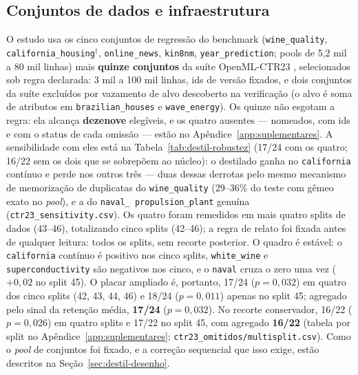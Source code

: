 \subsection{Conjuntos de dados e infraestrutura}
\label{sec:destil-setup}

\begin{sloppypar}
O estudo usa os cinco conjuntos de regressão do benchmark
(\texttt{wine\_quality}, \texttt{california\_\allowbreak housing}$^\dagger$,
\texttt{online\_news}, \texttt{kin8nm}, \texttt{year\_\allowbreak prediction};
pools de 5,2 mil a 80 mil linhas) mais \textbf{quinze conjuntos} da
suíte OpenML-CTR23 \citep{fischer2023}, selecionados sob regra
declarada: 3 mil a 100 mil linhas, ids de versão fixados, e dois
conjuntos da suíte excluídos por vazamento de alvo descoberto na
verificação (o alvo é soma de atributos em
\texttt{brazilian\_\allowbreak houses} e \texttt{wave\_energy}). Os
quinze não esgotam a regra: ela alcança \textbf{dezenove} elegíveis, e
os quatro ausentes --- nomeados, com ids e com o status de cada
omissão --- estão no Apêndice~\ref{app:suplementares}. A sensibilidade
com eles está na Tabela~\ref{tab:destil-robustez} (17/24 com os
quatro; 16/22 sem os dois que se sobrepõem ao núcleo): o destilado
ganha no \texttt{california} contínuo e perde nos outros três ---
duas dessas derrotas pelo mesmo mecanismo de memorização de
duplicatas do \texttt{wine\_quality} (29--36\% do teste com gêmeo
exato no \emph{pool}), e a do \texttt{naval\_\allowbreak
propulsion\_\allowbreak plant} genuína
(\texttt{ctr23\_\allowbreak sensitivity.csv}). Os quatro foram
remedidos em mais
quatro splits de dados (43--46), totalizando cinco splits (42--46);
a regra de relato foi
fixada antes de qualquer leitura: todos os splits, sem recorte
posterior. O quadro é estável: o \texttt{california} contínuo é
positivo nos cinco splits, \texttt{white\_wine} e
\texttt{superconductivity} são negativos nos cinco, e o
\texttt{naval} cruza o zero uma vez ($+0{,}02$ no split 45). O
placar ampliado é, portanto, 17/24 ($p=0{,}032$) em quatro dos cinco
splits (42, 43, 44, 46) e 18/24 ($p=0{,}011$) apenas no split 45;
agregado pelo sinal
da retenção média, \textbf{17/24} ($p=0{,}032$). No recorte
conservador, 16/22 ($p=0{,}026$) em quatro splits e 17/22 no split
45, com
agregado \textbf{16/22} (tabela por split no
Apêndice~\ref{app:suplementares};
\texttt{ctr23\_\allowbreak omitidos/\allowbreak multisplit.csv}).
Como o \emph{pool} de conjuntos foi fixado, e a correção sequencial
que isso exige, estão descritos na Seção~\ref{sec:destil-desenho}.


\end{sloppypar}
